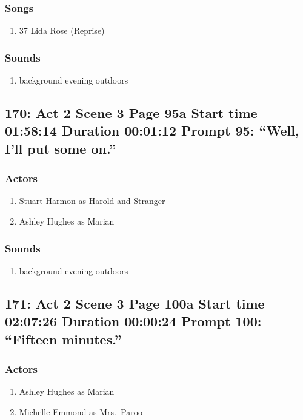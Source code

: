 \subsubsection{Songs}
\begin{enumerate}
\item 37 Lida Rose (Reprise)
\end{enumerate}\subsubsection{Sounds}
\begin{enumerate}
\item background evening outdoors
\end{enumerate}
\subsection{170: Act 2 Scene 3 Page 95a Start time 01:58:14 Duration 00:01:12 Prompt 95: ``Well, I'll put some on.''}

\subsubsection{Actors}
\begin{enumerate}
\item Stuart Harmon as Harold and Stranger
\item Ashley Hughes as Marian
\end{enumerate}

\subsubsection{Sounds}
\begin{enumerate}
\item background evening outdoors
\end{enumerate}
\subsection{171: Act 2 Scene 3 Page 100a Start time 02:07:26 Duration 00:00:24 Prompt 100: ``Fifteen minutes.''}

\subsubsection{Actors}
\begin{enumerate}
\item Ashley Hughes as Marian
\item Michelle Emmond as Mrs.~Paroo
\end{enumerate}

